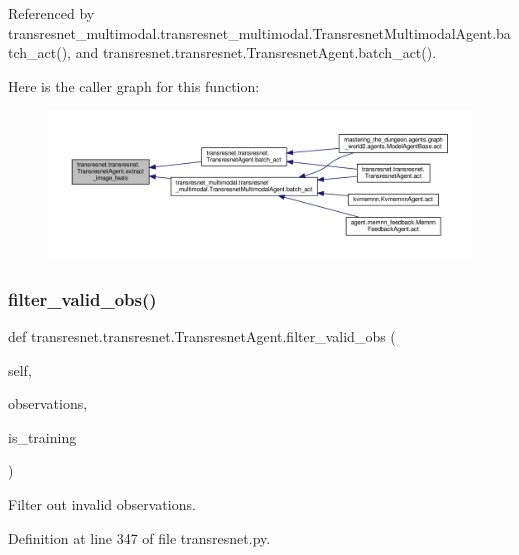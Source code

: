 Referenced by transresnet\+\_\+multimodal.\+transresnet\+\_\+multimodal.\+Transresnet\+Multimodal\+Agent.\+batch\+\_\+act(), and transresnet.\+transresnet.\+Transresnet\+Agent.\+batch\+\_\+act().

Here is the caller graph for this function\+:
\nopagebreak
\begin{figure}[H]
\begin{center}
\leavevmode
\includegraphics[width=350pt]{classtransresnet_1_1transresnet_1_1TransresnetAgent_a065c38b276b601ca97584fa4b9a76006_icgraph}
\end{center}
\end{figure}
\mbox{\label{classtransresnet_1_1transresnet_1_1TransresnetAgent_a96ebfee0a6b2acf1c1d1696befd397e3}} 
\subsubsection{\texorpdfstring{filter\+\_\+valid\+\_\+obs()}{filter\_valid\_obs()}}
{\footnotesize\ttfamily def transresnet.\+transresnet.\+Transresnet\+Agent.\+filter\+\_\+valid\+\_\+obs (\begin{DoxyParamCaption}\item[{}]{self,  }\item[{}]{observations,  }\item[{}]{is\+\_\+training }\end{DoxyParamCaption})}

\begin{DoxyVerb}Filter out invalid observations.\end{DoxyVerb}
 

Definition at line 347 of file transresnet.\+py.



